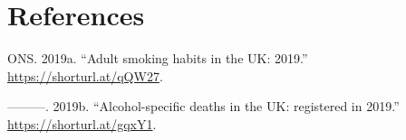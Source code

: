 \documentclass[
  11pt,
]{article}
\newlength{\cslhangindent}
\newenvironment{CSLReferences}[2] %
 {\begin{list}{}{%
  \setlength{\itemindent}{0pt}
  \setlength{\leftmargin}{0pt}
  \setlength{\parsep}{0pt}
  \ifodd #1
   \setlength{\leftmargin}{\cslhangindent}
   \setlength{\itemindent}{-1\cslhangindent}
  \fi
  \setlength{\itemsep}{#2\baselineskip}}}
 {\end{list}}
\begin{document}
\newpage

\section*{References}\label{references}

\label{refs}
\begin{CSLReferences}{1}{0}
ONS. 2019a. {``{Adult smoking habits in the UK: 2019}.''}
\url{https://shorturl.at/qQW27}.

---------. 2019b. {``{Alcohol-specific deaths in the UK: registered in
2019}.''} \url{https://shorturl.at/gqxY1}.

\end{CSLReferences}
\end{document}
